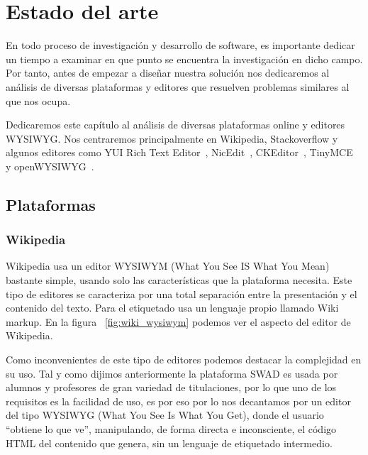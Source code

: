 \chapter{Estado del arte}
En todo proceso de investigación y desarrollo de software, es importante dedicar un tiempo a examinar en que punto se encuentra la investigación en dicho campo. Por tanto, antes de empezar a diseñar nuestra solución nos dedicaremos al análisis de diversas plataformas y editores que resuelven problemas similares al que nos ocupa.

Dedicaremos este capítulo al análisis de diversas plataformas online y editores WYSIWYG. Nos centraremos principalmente en Wikipedia, Stackoverflow y algunos editores como YUI Rich Text Editor~\cite{YUIEditor:yuieditor}, NicEdit~\cite{NicEdit:nicedit}, CKEditor~\cite{CKEditor:ckeditor}, TinyMCE~\cite{TinyMCE:tinymce} y openWYSIWYG~\cite{openWYSIWYG:openwysiwyg}.

\section{Plataformas}
\subsection{Wikipedia}

Wikipedia usa un editor WYSIWYM (What You See IS What You Mean) bastante simple, usando solo las características que la plataforma necesita. Este tipo de editores se caracteriza por una total separación entre la presentación y el contenido del texto. Para el etiquetado usa un lenguaje propio llamado Wiki markup. En la figura ~\ref{fig:wiki_wysiwym} podemos ver el aspecto del editor de Wikipedia.

Como inconvenientes de este tipo de editores podemos destacar la complejidad en su uso. Tal y como dijimos anteriormente la plataforma SWAD es usada por alumnos y profesores de gran variedad de titulaciones, por lo que uno de los requisitos es la facilidad de uso, es por eso por lo nos decantamos por un editor del tipo WYSIWYG (What You See Is What You Get), donde el usuario ``obtiene lo que ve'', manipulando, de forma directa e inconsciente, el código HTML del contenido que genera, sin un lenguaje de etiquetado intermedio. 

